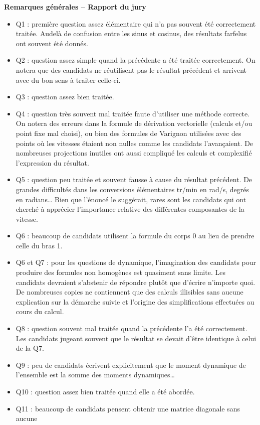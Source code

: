 \documentclass[10pt,fleqn]{article} %
\begin{document}
\textbf{Remarques générales -- Rapport du jury}
\begin{itemize}
\item Q1 : première question assez élémentaire qui n’a pas souvent été correctement traitée. Audelà de confusion entre les sinus et cosinus, des résultats farfelus ont souvent été donnés.
\item Q2 : question assez simple quand la précédente a été traitée correctement. On notera que
des candidats ne réutilisent pas le résultat précédent et arrivent avec du bon sens à traiter
celle-ci.
\item Q3 : question assez bien traitée.
\item Q4 : question très souvent mal traitée faute d’utiliser une méthode correcte. On notera des
erreurs dans la formule de dérivation vectorielle (calculs et/ou point fixe mal choisi), ou bien
des formules de Varignon utilisées avec des points où les vitesses étaient non nulles comme
les candidats l’avançaient. De nombreuses projections inutiles ont aussi compliqué les
calculs et complexifié l’expression du résultat.
\item Q5 : question peu traitée et souvent fausse à cause du résultat précédent. De grandes
difficultés dans les conversions élémentaires tr/min en rad/s, degrés en radians… Bien que
l'énoncé le suggérait, rares sont les candidats qui ont cherché à apprécier l'importance
relative des différentes composantes de la vitesse.
\item Q6 : beaucoup de candidats utilisent la formule du corps 0 au lieu de prendre celle du bras 1.
\item Q6 et Q7 : pour les questions de dynamique, l’imagination des candidats pour produire des
formules non homogènes est quasiment sans limite. Les candidats devraient s’abstenir de
répondre plutôt que d’écrire n’importe quoi. De nombreuses copies ne contiennent que des
calculs illisibles sans aucune explication sur la démarche suivie et l’origine des
simplifications effectuées au cours du calcul.
\item Q8 : question souvent mal traitée quand la précédente l’a été correctement. Les candidats
jugeant souvent que le résultat se devait d’être identique à celui de la Q7.
\item Q9 : peu de candidats écrivent explicitement que le moment dynamique de l’ensemble est
la somme des moments dynamiques…
\item Q10 : question assez bien traitée quand elle a été abordée.
\item Q11 : beaucoup de candidats pensent obtenir une matrice diagonale sans aucune

\end{itemize}
\end{document}
